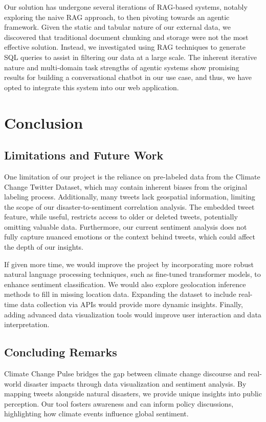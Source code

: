 \documentclass{ieeeaccess}
\begin{document}
Our solution has undergone several iterations of RAG-based systems, notably exploring the naive RAG approach, to then pivoting towards an agentic framework. Given the static and tabular nature of our external data, we discovered that traditional document chunking and storage were not the most effective solution. Instead, we investigated using RAG techniques to generate SQL queries to assist in filtering our data at a large scale. The inherent iterative nature and multi-domain task strengths of agentic systems show promising results for building a conversational chatbot in our use case, and thus, we have opted to integrate this system into our web application.

\section{Conclusion}
\label{sec:conclusion}

\subsection{Limitations and Future Work}
One limitation of our project is the reliance on pre-labeled data from the Climate Change Twitter Dataset, which may contain inherent biases from the original labeling process. Additionally, many tweets lack geospatial information, limiting the scope of our disaster-to-sentiment correlation analysis. The embedded tweet feature, while useful, restricts access to older or deleted tweets, potentially omitting valuable data. Furthermore, our current sentiment analysis does not fully capture nuanced emotions or the context behind tweets, which could affect the depth of our insights.

If given more time, we would improve the project by incorporating more robust natural language processing techniques, such as fine-tuned transformer models, to enhance sentiment classification. We would also explore geolocation inference methods to fill in missing location data. Expanding the dataset to include real-time data collection via APIs would provide more dynamic insights. Finally, adding advanced data visualization tools would improve user interaction and data interpretation.

\subsection{Concluding Remarks}
Climate Change Pulse bridges the gap between climate change discourse and real-world disaster impacts through data visualization and sentiment analysis. By mapping tweets alongside natural disasters, we provide unique insights into public perception. Our tool fosters awareness and can inform policy discussions, highlighting how climate events influence global sentiment.
\end{document}
